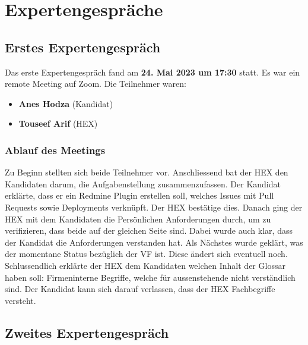 \chapter{Expertengespräche}
\section{Erstes Expertengespräch}
Das erste Expertengespräch fand am \textbf{24. Mai 2023 um 17:30} statt. Es war ein remote Meeting auf Zoom.
Die Teilnehmer waren:
\begin{itemize}
  \item \textbf{Anes Hodza} (Kandidat)
  \item \textbf{Touseef Arif} (HEX)
\end{itemize}

\subsection{Ablauf des Meetings}
Zu Beginn stellten sich beide Teilnehmer vor. Anschliessend bat der HEX den Kandidaten darum, die Aufgabenstellung
zusammenzufassen. Der Kandidat erklärte, dass er ein Redmine Plugin erstellen soll, welches Issues mit Pull Requests
sowie Deployments verknüpft. Der HEX bestätige dies. \newline
Danach ging der HEX mit dem Kandidaten die Persönlichen Anforderungen durch, um zu verifizieren, dass beide auf der
gleichen Seite sind. Dabei wurde auch klar, dass der Kandidat die Anforderungen verstanden hat. \newline
Als Nächstes wurde geklärt, was der momentane Status bezüglich der VF ist. Diese ändert sich eventuell noch. \newline
Schlussendlich erklärte der HEX dem Kandidaten welchen Inhalt der Glossar haben soll: Firmeninterne Begriffe, welche
für aussenstehende nicht verständlich sind. Der Kandidat kann sich darauf verlassen, dass der HEX Fachbegriffe
versteht. \newline

\section{Zweites Expertengespräch}
